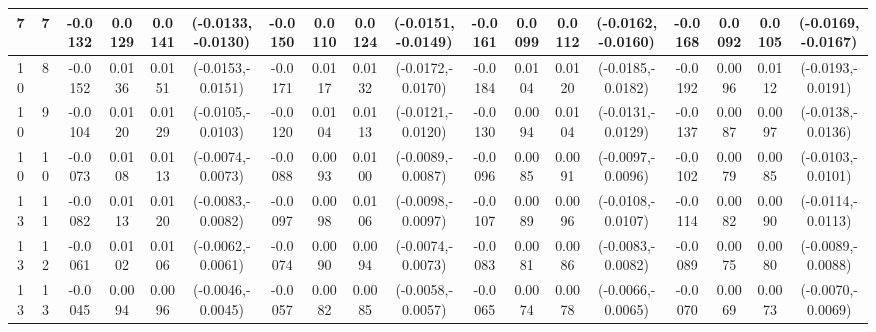 \documentclass[12pt,a4paper]{article}
\numberwithin{equation}{section}
\begin{document}
\begin{table}
\begin{tabular}{cccccccccccccccccc}
7 & 7
& -0.0132 & 0.0129 & 0.0141 & (-0.0133,-0.0130)
& -0.0150 & 0.0110 & 0.0124 & (-0.0151,-0.0149)
& -0.0161 & 0.0099 & 0.0112 & (-0.0162,-0.0160)
& -0.0168 & 0.0092 & 0.0105 & (-0.0169,-0.0167) \\

\midrule

10 & 8
& -0.0152 & 0.0136 & 0.0151 & (-0.0153,-0.0151)
& -0.0171 & 0.0117 & 0.0132 & (-0.0172,-0.0170)
& -0.0184 & 0.0104 & 0.0120 & (-0.0185,-0.0182)
& -0.0192 & 0.0096 & 0.0112 & (-0.0193,-0.0191) \\

10 & 9
& -0.0104 & 0.0120 & 0.0129 & (-0.0105,-0.0103)
& -0.0120 & 0.0104 & 0.0113 & (-0.0121,-0.0120)
& -0.0130 & 0.0094 & 0.0104 & (-0.0131,-0.0129)
& -0.0137 & 0.0087 & 0.0097 & (-0.0138,-0.0136) \\

10 & 10
& -0.0073 & 0.0108 & 0.0113 & (-0.0074,-0.0073)
& -0.0088 & 0.0093 & 0.0100 & (-0.0089,-0.0087)
& -0.0096 & 0.0085 & 0.0091 & (-0.0097,-0.0096)
& -0.0102 & 0.0079 & 0.0085 & (-0.0103,-0.0101) \\

\midrule

13 & 11
& -0.0082 & 0.0113 & 0.0120 & (-0.0083,-0.0082)
& -0.0097 & 0.0098 & 0.0106 & (-0.0098,-0.0097)
& -0.0107 & 0.0089 & 0.0096 & (-0.0108,-0.0107)
& -0.0114 & 0.0082 & 0.0090 & (-0.0114,-0.0113) \\

13 & 12
& -0.0061 & 0.0102 & 0.0106 & (-0.0062,-0.0061)
& -0.0074 & 0.0090 & 0.0094 & (-0.0074,-0.0073)
& -0.0083 & 0.0081 & 0.0086 & (-0.0083,-0.0082)
& -0.0089 & 0.0075 & 0.0080 & (-0.0089,-0.0088) \\

13 & 13
& -0.0045 & 0.0094 & 0.0096 & (-0.0046,-0.0045)
& -0.0057 & 0.0082 & 0.0085 & (-0.0058,-0.0057)
& -0.0065 & 0.0074 & 0.0078 & (-0.0066,-0.0065)
& -0.0070 & 0.0069 & 0.0073 & (-0.0070,-0.0069) \\

\bottomrule
\end{tabular}
\end{table}

\newpage
\end{document}
